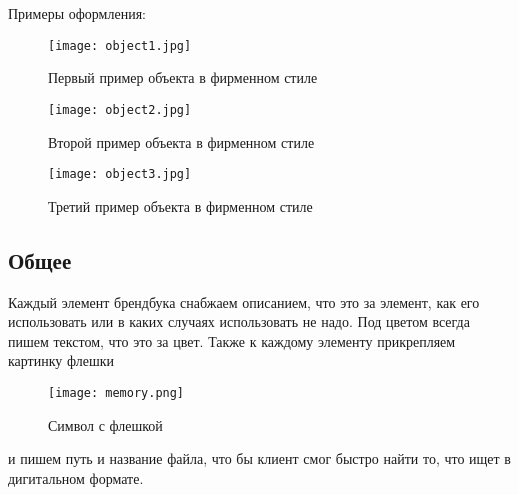 \documentclass[DIV=calc, paper=a4, fontsize=11pt]{scrartcl} %
\begin{document}
Примеры оформления:

            \begin{figure}[H]
            \centering
            \texttt{[image: object1.jpg]}
            \caption{Первый пример объекта в фирменном стиле \label{fig:object1.jpg}}
            \end{figure}
            
            \begin{figure}[H]
            \centering
            \texttt{[image: object2.jpg]}
            \caption{Второй пример объекта в фирменном стиле \label{fig:object2.jpg}}
            \end{figure}
            
            \begin{figure}[H]
            \centering
            \texttt{[image: object3.jpg]}
            \caption{Третий пример объекта в фирменном стиле \label{fig:object3.jpg}}
            \end{figure}
    
\subsection{Общее}
Каждый элемент брендбука снабжаем описанием, что это за элемент, как его использовать или в каких случаях использовать не надо. Под цветом всегда пишем текстом, что это за цвет. Также к каждому элементу прикрепляем картинку флешки 
            \begin{figure}[H]
            \centering
            \texttt{[image: memory.png]}
            \caption{Символ с флешкой \label{fig:memory.png}}
            \end{figure}
и пишем путь и название файла, что бы клиент смог быстро найти то, что ищет в дигитальном формате.





        
\end{document}
